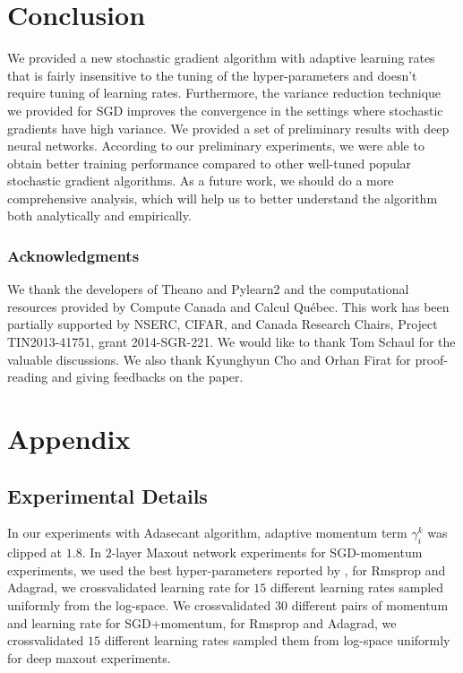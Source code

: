 \documentclass{article}
\begin{document}
\section{Conclusion}
We provided a new stochastic gradient algorithm with adaptive learning rates
that is fairly insensitive to the tuning of the hyper-parameters and doesn't require tuning of learning
rates. Furthermore, the variance reduction technique we provided for SGD improves the
convergence in the settings where stochastic gradients have high variance. We provided a set of preliminary
results with deep neural networks. According to our preliminary experiments, we were able to obtain better
training performance compared to other well-tuned popular stochastic gradient algorithms. As a future
work, we should do a more comprehensive analysis, which will help us to better understand
the algorithm both analytically and empirically.

\vspace*{-1mm}
\subsubsection*{Acknowledgments}
\vspace*{-1mm}

We thank the developers of Theano \citep{Bastien-2012} and Pylearn2 \citep{pylearn2_arxiv_2013} and the computational resources
provided by Compute Canada and Calcul Qu\'ebec. This work has been partially supported by NSERC,
CIFAR, and Canada Research Chairs, Project TIN2013-41751, grant 2014-SGR-221. We would 
like to thank Tom Schaul for the valuable discussions. We also thank Kyunghyun Cho and Orhan Firat
for proof-reading and giving feedbacks on the paper.

{\small

}

\appendix
\section{Appendix}
\subsection{Experimental Details}
In our experiments with Adasecant algorithm, adaptive momentum term $\gamma_i^k$ was clipped at
$1.8$. In $2$-layer Maxout network experiments for SGD-momentum experiments, we used the best hyper-parameters reported 
by \cite{goodfellow2013maxout}, for Rmsprop and Adagrad, we crossvalidated learning rate for $15$ different learning rates 
sampled uniformly from the log-space. We crossvalidated $30$ different pairs of momentum and learning rate for SGD+momentum,
for Rmsprop and Adagrad, we crossvalidated $15$ different learning rates sampled them from log-space uniformly
 for deep maxout experiments.
\end{document}
